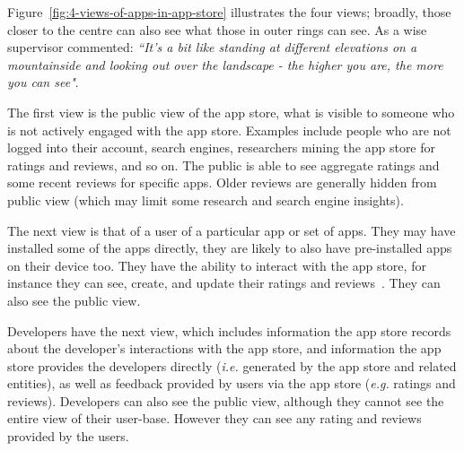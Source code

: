 Figure~\ref{fig:4-views-of-apps-in-app-store} illustrates the four views; broadly, those closer to the centre can also see what those in outer rings can see. As a wise supervisor commented: \emph{``It's a bit like standing at different elevations on a mountainside and looking out over the landscape - the higher you are, the more you can see"}.

The first view is the public view of the app store, what is visible to someone who is not actively engaged with the app store. Examples include people who are not logged into their account, search engines, researchers mining the app store for ratings and reviews, and so on. The public is able to see aggregate ratings and some recent reviews for specific apps. Older reviews are generally hidden from public view (which may limit some research and search engine insights).

The next view is that of a user of a particular app or set of apps. They may have installed some of the apps directly, they are likely to also have pre-installed apps on their device too. They have the ability to interact with the app store, for instance they can see, create, and update their ratings and reviews~. They can also see the public view.

Developers have the next view, which includes information the app store records about the developer's interactions with the app store, and information the app store provides the developers directly (\emph{i.e.} generated by the app store and related entities), as well as feedback provided by users via the app store (\emph{e.g.} ratings and reviews). Developers can also see the public view, although they cannot see the entire view of their user-base. However they can see any rating and reviews provided by the users.

